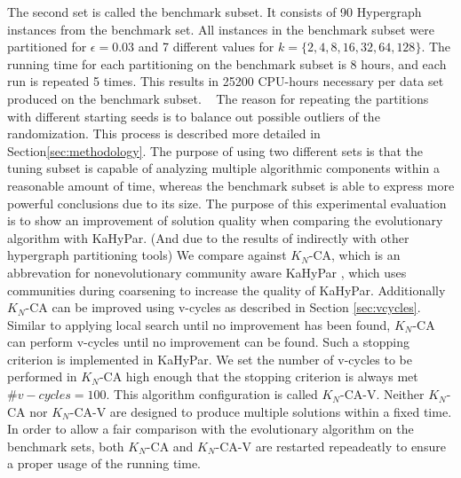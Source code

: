 \documentclass[a4paper,12pt,titlepage, BCOR7mm,headsepline]{scrbook}
\numberwithin{equation}{section}
\begin{document}
The second set is called the benchmark subset. It consists of 90 Hypergraph instances from the benchmark set. All instances in the benchmark subset were partitioned for $\epsilon = 0.03$ and 7 different values for $k = \{2,4,8,16,32,64,128\}$. The running time for each partitioning on the benchmark subset is 8 hours, and each run is repeated 5 times. This results in 25200 CPU-hours necessary per data set produced on the benchmark subset.
\newline ~ \newline
The reason for repeating the partitions with different starting seeds is to balance out possible outliers of the randomization. This process is described more detailed in Section\ref{sec:methodology}.
The purpose of using two different sets is that the tuning subset is capable of analyzing multiple algorithmic components within a reasonable amount of time, whereas the benchmark subset is able to express more powerful conclusions due to its size.
The purpose of this experimental evaluation is to show an improvement of solution quality when comparing the evolutionary algorithm with KaHyPar. (And due to the results of \cite{akhremtsev2017engineering} indirectly with other hypergraph partitioning tools)
We compare against $K_N$-CA, which is an abbrevation for nonevolutionary community aware KaHyPar \cite{heuer2017improving}, which uses communities during coarsening to increase the quality of KaHyPar. Additionally $K_N$-CA can be improved using v-cycles as described in Section \ref{sec:vcycles}. Similar to \cite{armstrong2010investigation} applying local search until no improvement has been found, $K_N$-CA can perform v-cycles until no improvement can be found. Such a stopping criterion is implemented in KaHyPar. We set the number of v-cycles to be performed in $K_N$-CA high enough that the stopping criterion is always met $\#v-cycles = 100$. This algorithm configuration is called $K_N$-CA-V.
Neither $K_N$-CA nor $K_N$-CA-V are designed to produce multiple solutions within a fixed time. In order to allow a fair comparison with the evolutionary algorithm on the benchmark sets, both $K_N$-CA and $K_N$-CA-V are restarted repeadeatly to ensure a proper usage of the running time.
\end{document}
